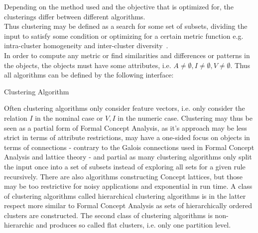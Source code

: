 Depending on the method used and the objective that is optimized for, the clusterings differ between different algorithms. \\
Thus clustering may be defined as a search for some set of subsets, dividing the input to satisfy some condition or optimizing for a certain metric function e.g. intra-cluster homogeneity and inter-cluster diversity~\cite{Fisher1987}. \\
In order to compute any metric or find similarities and differences or patterns in the objects, the objects must have some attributes, i.e. $A \neq \emptyset, I \neq \emptyset, V \neq \emptyset$.
Thus all algorithms can be defined by the following interface:
\begin{algorithm}[h]
\caption{Clustering Algorithm}\label{clustering}
\end{algorithm}
Often clustering algorithms only consider feature vectors, i.e. only consider the relation $I$ in the nominal case or $V, I$ in the numeric case. Clustering may thus be seen as a partial form of Formal Concept Analysis, as it's approach may be less strict in terms of attribute restrictions, may have a one-sided focus on objects in terms of connections - contrary to the Galois connections used in Formal Concept Analysis and lattice theory - and partial as many clustering algorithms only split the input once into a set of subsets instead of exploring all sets for a given rule recursively.
There are also algorithms constructing Concept lattices, but those may be too restrictive for noisy applications and exponential in run time\cite{doi:10.1111/j.1467-8640.1995.tb00031.x}. A class of clustering algorithms called hierarchical clustering algorithms is in the latter respect more similar to Formal Concept Analysis as sets of hierarchically ordered clusters are constructed.
The second class of clustering algorithms is non-hierarchic and produces so called flat clusters, i.e. only one partition level.



